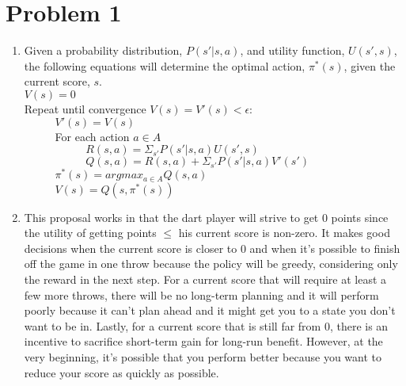 \documentclass[12pt,letterpaper]{article}
\begin{document}
\thispagestyle{fancy}\small
  \section*{Problem 1}
  \begin{enumerate}[label={(\alph*) }]
        \item Given a probability distribution, $P(s'|s,a)$, and utility function, $U(s',s)$, the following equations will determine the optimal action, $\pi^*(s)$, given the current score, $s$. \medskip \\
        $V(s) =  0             $\\
        Repeat until convergence $V(s) = V'(s) < \epsilon$:\ \\
        $\phantom{points}V'(s) = V(s) $ \\
        $\phantom{points}$For each action $a \in A$ \\
        $\phantom{pointspoints}R(s,a)= \Sigma_{s'} P(s'|s,a)U(s',s)$\\
        $\phantom{pointspoints}Q(s,a)=R(s,a) + \Sigma_{s'} P(s'|s,a)V'(s')$\\
        $\phantom{points}\pi^*(s) = argmax_{a \in A}Q(s,a)$\\
        $\phantom{points}V(s) = Q(s,\pi^*(s))$\\ 
        
        
        \item This proposal works in that the dart player will strive to get 0 points since the utility of getting points $\leq $ his current score is non-zero.    It makes good decisions when the current score is closer to 0 and when it's possible to finish off the game in one throw because the policy will be greedy, considering only the reward in the next step. For a current score that will require at least a few more throws, there will be no long-term planning and it will perform poorly because it can't plan ahead and it might get you to a state you don't want to be in. Lastly, for a current score that is still far from 0, there is an incentive to sacrifice short-term gain for long-run benefit.
However, at the very beginning, it's possible that you perform better because you want to reduce your score as quickly as possible.   \end{enumerate}
\end{document}
